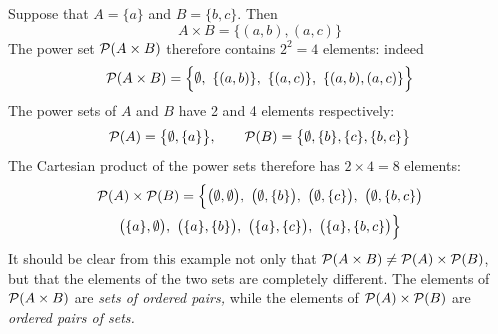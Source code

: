\begin{example}{}{}
	Suppose that $A=\{a\}$ and $B=\{b,c\}$. Then
	\[
		A\times B=\{(a,b),(a,c)\}
	\]
	The power set $\mathcal{P}(A\times B)$ therefore contains $2^2=4$ elements: indeed
	\[
		\cP(A\times B)=\Big\{\emptyset,\ \{(a,b)\},\ \{(a,c)\},\ \{(a,b),(a,c)\}\Big\}
	\]
	The power sets of $A$ and $B$ have 2 and 4 elements respectively:
	\[
		\mathcal{P}(A)=\big\{\emptyset,\{a\}\big\},\qquad\mathcal{P}(B)=\big\{\emptyset,\{b\},\{c\},\{b,c\}\big\}
	\]
	The Cartesian product of the power sets therefore has $2\times 4=8$ elements:
	\begin{multline*}
		\mathcal{P}(A)\times\mathcal{P}(B)
		=\Big\{\big(\emptyset,\emptyset\big),\  \big(\emptyset,\{b\}\big),\  \big(\emptyset,\{c\}\big),\  \big(\emptyset,\{b,c\}\big)\\*
		\big(\{a\},\emptyset\big),\  \big(\{a\},\{b\}\big),\  \big(\{a\},\{c\}\big),\  \big(\{a\},\{b,c\}\big)\Big\}
	\end{multline*}
	It should be clear from this example not only that $\mathcal{P}(A\times B)\neq\mathcal{P}(A)\times\mathcal{P}(B)$, but that the elements of the two sets are completely different. The elements of $\mathcal{P}(A\times B)$ are \emph{sets of ordered pairs,} while the elements of $\mathcal{P}(A)\times\mathcal{P}(B)$ are \emph{ordered pairs of sets.}
\end{example}



% 


